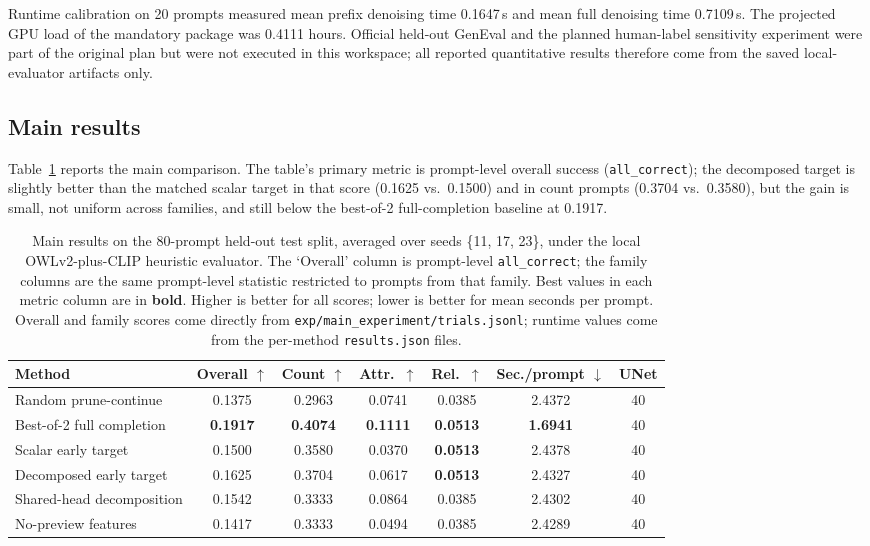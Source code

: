 \documentclass{article}
\begin{document}
Runtime calibration on 20 prompts measured mean prefix denoising time 0.1647\,s and mean full denoising time 0.7109\,s. The projected GPU load of the mandatory package was 0.4111 hours. Official held-out GenEval and the planned human-label sensitivity experiment were part of the original plan but were not executed in this workspace; all reported quantitative results therefore come from the saved local-evaluator artifacts only.

\subsection{Main results}
Table~\ref{tab:main-results} reports the main comparison. The table's primary metric is prompt-level overall success (\texttt{all\_correct}); the decomposed target is slightly better than the matched scalar target in that score (0.1625 vs.\ 0.1500) and in count prompts (0.3704 vs.\ 0.3580), but the gain is small, not uniform across families, and still below the best-of-2 full-completion baseline at 0.1917.

\begin{table}[t]
\caption{Main results on the 80-prompt held-out test split, averaged over seeds \{11, 17, 23\}, under the local OWLv2-plus-CLIP heuristic evaluator. The `Overall' column is prompt-level \texttt{all\_correct}; the family columns are the same prompt-level statistic restricted to prompts from that family. Best values in each metric column are in \textbf{bold}. Higher is better for all scores; lower is better for mean seconds per prompt. Overall and family scores come directly from \texttt{exp/main\_experiment/trials.jsonl}; runtime values come from the per-method \texttt{results.json} files.}
\label{tab:main-results}
\centering
\small
\begin{tabular}{lcccccc}
\toprule
Method & Overall $\uparrow$ & Count $\uparrow$ & Attr.\ $\uparrow$ & Rel.\ $\uparrow$ & Sec./prompt $\downarrow$ & UNet \\
\midrule
Random prune-continue & 0.1375 & 0.2963 & 0.0741 & 0.0385 & 2.4372 & 40 \\
Best-of-2 full completion & \textbf{0.1917} & \textbf{0.4074} & \textbf{0.1111} & \textbf{0.0513} & \textbf{1.6941} & 40 \\
Scalar early target & 0.1500 & 0.3580 & 0.0370 & \textbf{0.0513} & 2.4378 & 40 \\
Decomposed early target & 0.1625 & 0.3704 & 0.0617 & \textbf{0.0513} & 2.4327 & 40 \\
Shared-head decomposition & 0.1542 & 0.3333 & 0.0864 & 0.0385 & 2.4302 & 40 \\
No-preview features & 0.1417 & 0.3333 & 0.0494 & 0.0385 & 2.4289 & 40 \\
\bottomrule
\end{tabular}
\end{table}
\end{document}
